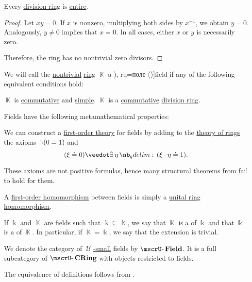 \begin{proposition}\label{thm:division_ring_is_entire}
  Every \hyperref[def:division_ring]{division ring} is \hyperref[def:entire_semiring]{entire}.
\end{proposition}
\begin{proof}
  Let \( xy = 0 \). If \( x \) is nonzero, multiplying both sides by \( x^{-1} \), we obtain \( y = 0 \). Analogously, \( y \neq 0 \) implies that \( x = 0 \). In all cases, either \( x \) or \( y \) is necessarily zero.

  Therefore, the ring has no nontrivial zero divisors.
\end{proof}

\begin{definition}\label{def:field}
  We will call the \hyperref[def:ring/trivial]{nontrivial} \hyperref[def:ring]{ring} \( \BbbK \) a \term[bg=поле (\cite[4]{КоцевСидеров2016}), ru=поле (\cite[def. 1.3.2]{Винберг2014})]{field} if any of the following equivalent conditions hold:
  \begin{thmenum}
     \( \BbbK \) is \hyperref[def:ring/commutative]{commutative} and \hyperref[def:simple_object]{simple}.
     \( \BbbK \) is a \hyperref[def:ring/commutative]{commutative} \hyperref[def:division_ring]{division ring}.
  \end{thmenum}

  Fields have the following metamathematical properties:
  \begin{thmenum}
     We can construct a \hyperref[def:first_order_theory]{first-order theory} for fields by adding to the \hyperref[def:semiring/theory]{theory of rings} the axioms \( \dot\neg (0 \doteq 1) \) and
    \begin{equation}\label{eq:def:field/theory/invertibility}
      (\xi \syneq 0) \synvee \qexists \eta (\xi \cdot \eta \syneq 1).
    \end{equation}

    These axioms are not \hyperref[def:positive_formula]{positive formulas}, hence many structural theorems from  fail to hold for them.

     A \hyperref[def:first_order_homomorphism]{first-order homomorphism} between fields is simply a \hyperref[def:ring/homomorphism]{unital ring homomorphism}.

     If \( \Bbbk \) and \( \BbbK \) are fields such that \( \Bbbk \subseteq \BbbK \), we say that \( \BbbK \) is a  of \( \Bbbk \) and that \( \Bbbk \) is a  of \( \BbbK \). In particular, if \( \BbbK = \Bbbk \), we say that the extension is trivial.

     We denote the category of \hyperref[def:large_and_small_sets]{\( \mscrU \)-small} fields by \( \ucat{Field} \). It is a full subcategory of \hyperref[def:ring/category]{\( \ucat{CRing} \)} with objects restricted to fields.
  \end{thmenum}
\end{definition}
\begin{defproof}
  The equivalence of definitions follows from .
\end{defproof}
